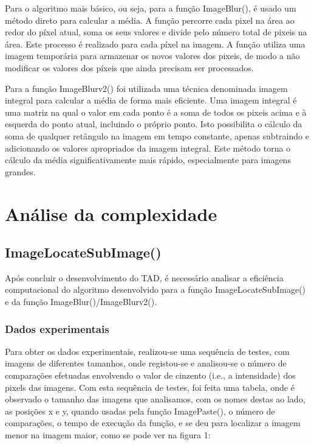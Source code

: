 \documentclass{article}
\begin{document}
Para o algoritmo mais básico, ou seja, para a função ImageBlur(), é usado um método direto para calcular a média.
A função percorre cada pixel na área ao redor do píxel atual, soma os seus valores e divide pelo número total de pixeis na área. 
Este processo é realizado para cada píxel na imagem. A função utiliza uma imagem temporária para
 armazenar os novos valores dos pixeis, de modo a não modificar os valores dos píxeis que ainda 
 precisam ser processados.


Para a função ImageBlurv2() foi utilizada uma técnica denominada imagem integral para calcular a média de 
 forma mais eficiente. Uma imagem integral é uma matriz na qual o valor em cada ponto é a soma de 
 todos os pixeis acima e à esquerda do ponto atual, incluindo o próprio ponto. Isto possibilita o 
 cálculo da soma de qualquer retângulo na imagem em tempo constante, apenas subtraindo e adicionando 
 os valores apropriados da imagem integral. Este método torna o cálculo da média significativamente mais
  rápido, especialmente para imagens grandes.














\section{Análise da complexidade}
\subsection{ImageLocateSubImage()}





Após concluir o desenvolvimento do TAD, é necessário analisar a eficiência computacional do
algoritmo desenvolvido para a função ImageLocateSubImage() e da função ImageBlur()/ImageBlurv2().
\subsubsection{Dados experimentais}
Para obter os dados experimentais, realizou-se uma sequência de testes, com imagens de diferentes tamanhos, onde registou-se e
analisou-se o número de comparações efetuadas envolvendo o valor de cinzento (i.e., a
intensidade) dos pixels das imagens. 
Com esta sequência de testes, foi feita uma tabela, onde é observado o tamanho das imagens que analisamos, 
com os nomes destas ao lado, 
as posições x e y, quando usadas pela função ImagePaste(), o número de comparações, o tempo de execução da função, e 
se deu para localizar a imagem menor na imagem maior, como se pode ver na figura 1:
\end{document}
